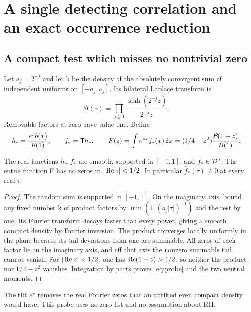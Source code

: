 \section{A single detecting correlation and an exact occurrence reduction}\label{sec:probe}
\subsection{A compact test which misses no nontrivial zero}
Let $a_j=2^{-j}$ and let b be the density of the absolutely
convergent sum of independent uniforms on $[-a_j,a_j]$.
Its bilateral Laplace transform is
\begin{equation}\label{eq:probe-product}
\mathcal B(z)=\prod_{j\ge1}\frac{\sinh(2^{-j}z)}{2^{-j}z}.
\end{equation}
Removable factors at zero have value one. Define
\begin{equation}\label{eq:probe}
h_*=\frac{e^x b(x)}{\mathcal B(1)},\qquad f_*=\mathsf T h_*,
\qquad
F(z)=\int e^{zx}f_*(x)\,\mathrm d x
=(1/4-z^2)\frac{\mathcal B(1+z)}{\mathcal B(1)} .
\end{equation}

\begin{lemma}\label{lem:probe}
The real functions $h_*,f_*$ are smooth, supported in
$[-1,1]$, and $f_*\in\mathcal D^0$. The entire function F has
no zeros in $|\operatorname{Re} z|<1/2$. In particular
$\widehat f_*(\tau)\ne0$ at every real $\tau$.
\end{lemma}
\begin{proof}
The random sum is supported in $[-1,1]$. On the imaginary
axis, bound any fixed number k of product factors by
$\min(1,(a_j|\tau|)^{-1})$ and the rest by one.
Its Fourier transform decays faster than every power,
giving a smooth compact density by Fourier inversion.
The product converges locally uniformly in the plane
because its tail deviations from one are summable.
All zeros of each factor lie on the imaginary axis, and
off that axis the nonzero summable tail cannot vanish.
For $|\operatorname{Re} z|<1/2$, one has $\operatorname{Re}(1+z)>1/2$, so neither
the product nor $1/4-z^2$ vanishes. Integration by parts
proves \eqref{eq:probe} and the two neutral moments.
\end{proof}
The tilt $e^x$ removes the real Fourier zeros that an
untilted even compact density would have. This probe
uses no zero list and no assumption about RH.

